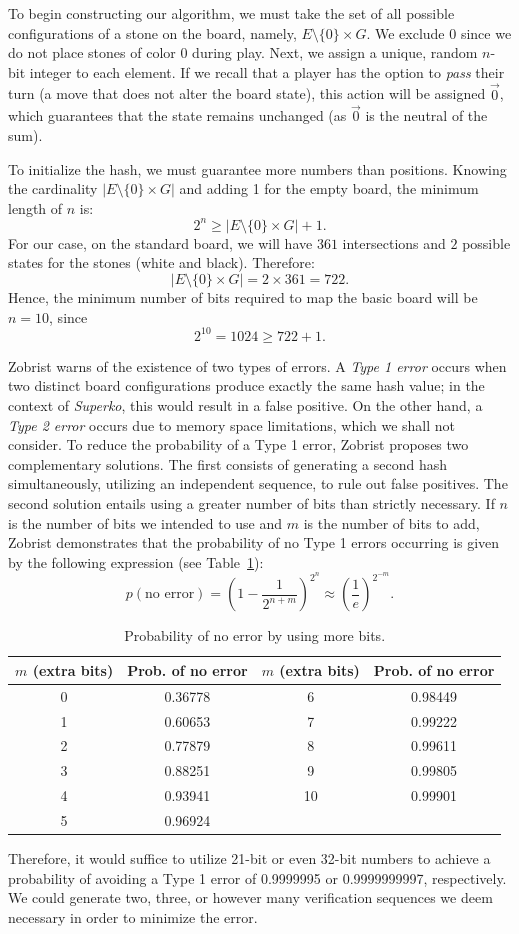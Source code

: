 To begin constructing our algorithm, we must take the set of all possible configurations of a stone on the board, namely, \(E \setminus \{0\} \times G.\)
We exclude $0$ since we do not place stones of color $0$ during play. Next, we assign a unique, random \(n\)-bit integer to each element. If we recall that a player has the option to \textit{pass} their turn (a move that does not alter the board state), this action will be assigned \(\vec{0}\), which guarantees that the state remains unchanged (as \(\vec{0}\) is the neutral of the sum).

To initialize the hash, we must guarantee more numbers than positions. Knowing the cardinality \(|E\setminus\{0\}\times G|\) and adding 1 for the empty board, the minimum length of \(n\) is:
\[ 2^n \geq |E \setminus \{0\} \times G| + 1. \]
For our case, on the standard board, we will have $361$ intersections and $2$ possible states for the stones (white and black). 
Therefore:
$$|E\setminus\{0\} \times G| = 2 \times 361 = 722.$$
Hence, the minimum number of bits required to map the basic board will be $n = 10$, since
$$2^{10} = 1024 \geq 722 + 1.$$

Zobrist warns of the existence of two types of errors. A \textit{Type 1 error} occurs when two distinct board configurations produce exactly the same hash value; in the context of \textit{Superko}, this would result in a false positive. On the other hand, a \textit{Type 2 error} occurs due to memory space limitations, which we shall not consider.
To reduce the probability of a Type 1 error, Zobrist proposes two complementary solutions. The first consists of generating a second hash simultaneously, utilizing an independent sequence, to rule out false positives. The second solution entails using a greater number of bits than strictly necessary. If $n$ is the number of bits we intended to use and $m$ is the number of bits to add, Zobrist demonstrates that the probability of no Type 1 errors occurring is given by the following expression (see Table~\ref{Tabla_prob}):
$$p(\text{no error}) = \left( 1 - \frac{1}{2^{n+m}} \right)^{2^n} \approx \left( \frac{1}{e} \right)^{2^{-m}}.$$
\begin{table}[H]
	\centering
	\begin{tabular}{c|c || c|c}
		\textbf{$m$ (extra bits)} & \textbf{Prob. of no error} & \textbf{$m$ (extra bits)} & \textbf{Prob. of no error} \\ \hline
		0 & 0.36778 & 6  & 0.98449 \\
		1 & 0.60653 & 7  & 0.99222 \\
		2 & 0.77879 & 8  & 0.99611 \\
		3 & 0.88251 & 9  & 0.99805 \\
		4 & 0.93941 & 10 & 0.99901 \\
		5 & 0.96924 & \multicolumn{2}{c}{}
	\end{tabular}
	\caption{Probability of no error by using more bits.}
	\label{Tabla_prob}
\end{table}
Therefore, it would suffice to utilize 21-bit or even 32-bit numbers to achieve a probability of avoiding a Type 1 error of 0.9999995 or 0.9999999997, respectively. We could generate two, three, or however many verification sequences we deem necessary in order to minimize the error.

